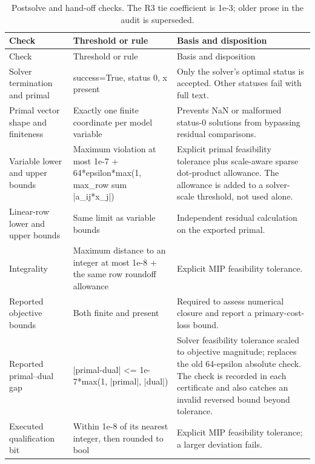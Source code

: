 \documentclass[preprint,11pt,authoryear]{elsarticle}
\begin{document}
\begingroup\small\setlength{\tabcolsep}{4pt}\renewcommand{\arraystretch}{1.18}
\renewcommand{\thetable}{B5}
\begin{longtable}{>{\raggedright\arraybackslash}p{3.0cm}>{\raggedright\arraybackslash}p{5.3cm}>{\raggedright\arraybackslash}p{6.2cm}}
\caption{Postsolve and hand-off checks. The R3 tie coefficient is 1e-3; older prose in the audit is superseded.}\label{tab:numerical_checks}\\
\toprule
Check & Threshold or rule & Basis and disposition \\
\midrule
\endfirsthead
Check & Threshold or rule & Basis and disposition \\
\midrule
\endhead
\bottomrule\endfoot
Solver termination and primal & success=True, status 0, x present & Only the solver's optimal status is accepted. Other statuses fail with full text. \\
Primal vector shape and finiteness & Exactly one finite coordinate per model variable & Prevents NaN or malformed status-0 solutions from bypassing residual comparisons. \\
Variable lower and upper bounds & Maximum violation at most 1e-7 + 64*epsilon*max(1, max\_row sum |a\_ij*x\_j|) & Explicit primal feasibility tolerance plus scale-aware sparse dot-product allowance. The allowance is added to a solver-scale threshold, not used alone. \\
Linear-row lower and upper bounds & Same limit as variable bounds & Independent residual calculation on the exported primal. \\
Integrality & Maximum distance to an integer at most 1e-8 + the same row roundoff allowance & Explicit MIP feasibility tolerance. \\
Reported objective bounds & Both finite and present & Required to assess numerical closure and report a primary-cost-loss bound. \\
Reported primal--dual gap & |primal-dual| <= 1e-7*max(1, |primal|, |dual|) & Solver feasibility tolerance scaled to objective magnitude; replaces the old 64-epsilon absolute check. The check is recorded in each certificate and also catches an invalid reversed bound beyond tolerance. \\
Executed qualification bit & Within 1e-8 of its nearest integer, then rounded to bool & Explicit MIP feasibility tolerance; a larger deviation fails. \\

\end{longtable}
\end{document}
